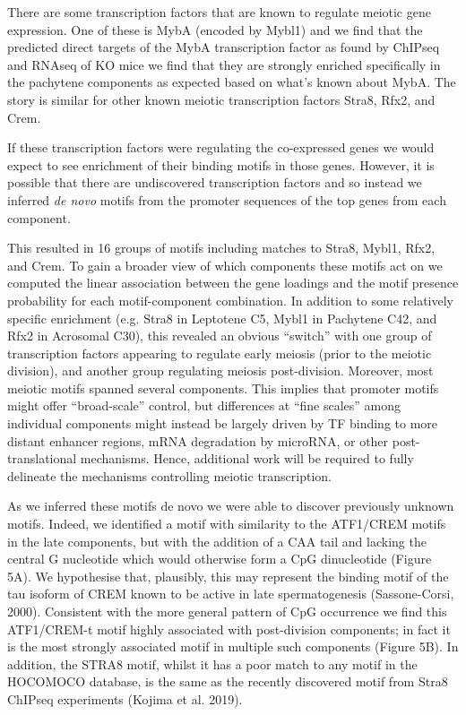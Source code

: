 There are some transcription factors that are known to regulate meiotic gene expression. One of these is MybA (encoded by Mybl1) and we find that the predicted direct targets of the MybA transcription factor as found by ChIPseq and RNAseq of KO mice we find that they are strongly enriched specifically in the pachytene components as expected based on what's known about MybA. The story is similar for other known meiotic transcription factors Stra8, Rfx2, and Crem.

If these transcription factors were regulating the co-expressed genes we would expect to see enrichment of their binding motifs in those genes. However, it is possible that there are undiscovered transcription factors and so instead we inferred \textit{de novo} motifs from the promoter sequences of the top genes from each component. 

This resulted in 16 groups of motifs including matches to Stra8, Mybl1, Rfx2, and Crem. To gain a broader view of which components these motifs act on we computed the linear association between the gene loadings and the motif presence probability for each motif-component combination. In addition to some relatively specific enrichment (e.g. Stra8 in Leptotene C5, Mybl1 in Pachytene C42, and Rfx2 in Acrosomal C30), this revealed an obvious “switch” with one group of transcription factors appearing to regulate early meiosis (prior to the meiotic division), and another group regulating meiosis post-division. Moreover, most meiotic motifs spanned several components. This implies that promoter motifs might offer “broad-scale” control, but differences at “fine scales” among individual components might instead be largely driven by TF binding to more distant enhancer regions, mRNA degradation by microRNA, or other post-translational mechanisms. Hence, additional work will be required to fully delineate the mechanisms controlling meiotic transcription.

As we inferred these motifs de novo we were able to discover previously unknown motifs. Indeed, we identified a motif with similarity to the ATF1/CREM motifs in the late components, but with the addition of a CAA tail and lacking the central G nucleotide which would otherwise form a CpG dinucleotide (Figure 5A). We hypothesise that, plausibly, this may represent the binding motif of the tau isoform of CREM known to be active in late spermatogenesis (Sassone-Corsi, 2000). Consistent with the more general pattern of CpG occurrence we find this ATF1/CREM-t motif highly associated with post-division components; in fact it is the most strongly associated motif in multiple such components (Figure 5B). In addition, the STRA8 motif, whilst it has a poor match to any motif in the HOCOMOCO database, is the same as the recently discovered motif from Stra8 ChIPseq experiments (Kojima et al. 2019).



